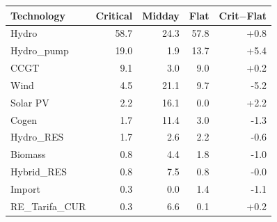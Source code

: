 \begin{tabular}{l r r r r}
\toprule
Technology & Critical & Midday & Flat & Crit$-$Flat \\
\midrule
Hydro & 58.7 & 24.3 & 57.8 & +0.8 \\
Hydro\_pump & 19.0 & 1.9 & 13.7 & +5.4 \\
CCGT & 9.1 & 3.0 & 9.0 & +0.2 \\
Wind & 4.5 & 21.1 & 9.7 & -5.2 \\
Solar PV & 2.2 & 16.1 & 0.0 & +2.2 \\
Cogen & 1.7 & 11.4 & 3.0 & -1.3 \\
Hydro\_RES & 1.7 & 2.6 & 2.2 & -0.6 \\
Biomass & 0.8 & 4.4 & 1.8 & -1.0 \\
Hybrid\_RES & 0.8 & 7.5 & 0.8 & -0.0 \\
Import & 0.3 & 0.0 & 1.4 & -1.1 \\
RE\_Tarifa\_CUR & 0.3 & 6.6 & 0.1 & +0.2 \\
\bottomrule
\end{tabular}
